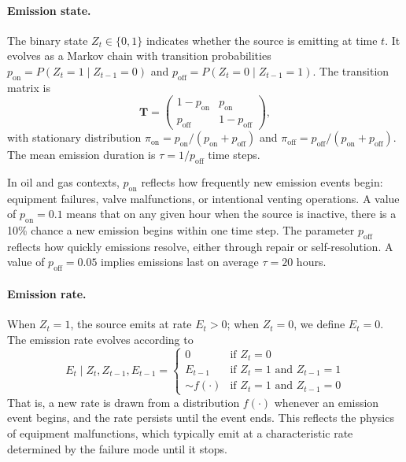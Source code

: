 \documentclass[11pt]{article}
\newcommand{\edit}[1]{#1}
\begin{document}
\paragraph{Emission state.} The binary state $Z_t \in \{0,1\}$ indicates whether the source is emitting at time $t$. It evolves as a Markov chain with transition probabilities $p_{\text{on}} = P(Z_t = 1 \mid Z_{t-1} = 0)$ and $p_{\text{off}} = P(Z_t = 0 \mid Z_{t-1} = 1)$. The transition matrix is
\begin{equation}
    \mathbf{T} = \begin{pmatrix} 1 - p_{\text{on}} & p_{\text{on}} \\ p_{\text{off}} & 1 - p_{\text{off}} \end{pmatrix},
\end{equation}
with stationary distribution $\pi_{\text{on}} = p_{\text{on}}/(p_{\text{on}} + p_{\text{off}})$ and $\pi_{\text{off}} = p_{\text{off}}/(p_{\text{on}} + p_{\text{off}})$. The mean emission duration is $\tau = 1/p_{\text{off}}$ time steps.

In oil and gas contexts, $p_{\text{on}}$ reflects how frequently new emission events begin: equipment failures, valve malfunctions, or intentional venting operations. A value of $p_{\text{on}} = 0.1$ means that on any given \edit{hour} when the source is inactive, there is a 10\% chance a new emission begins within one time step. The parameter $p_{\text{off}}$ reflects how quickly emissions resolve, either through repair or self-resolution. A value of $p_{\text{off}} = 0.05$ implies emissions last on average $\tau = 20$ hours.

\paragraph{Emission rate.} When $Z_t = 1$, the source emits at rate $E_t > 0$; when $Z_t = 0$, we define $E_t = 0$. The emission rate evolves according to
\begin{equation}
    E_t \mid Z_t, Z_{t-1}, E_{t-1} =
    \begin{cases}
        0 & \text{if } Z_t = 0 \\
        E_{t-1} & \text{if } Z_t = 1 \text{ and } Z_{t-1} = 1 \\
        \sim f(\cdot) & \text{if } Z_t = 1 \text{ and } Z_{t-1} = 0
    \end{cases}
\end{equation}
That is, a new rate is drawn from a distribution $f(\cdot)$ whenever an emission event begins, and the rate persists until the event ends. This reflects the physics of equipment malfunctions, which typically emit at a characteristic rate determined by the failure mode until it stops.
\end{document}
